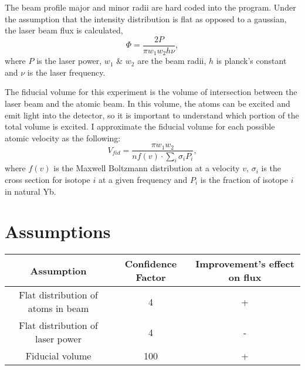 \documentclass[12pt, a4paper]{article}
\begin{document}
The beam profile major and minor radii are hard coded into the program. Under the assumption that the intensity distribution is flat as opposed to a gaussian, the laser beam flux is calculated,
\begin{equation}
\Phi = \frac{2P}{\pi w_1 w_2 h \nu},
\end{equation}
where $P$ is the laser power, $w_1$ \& $w_2$ are the beam radii, $h$ is planck's constant and $\nu$ is the laser frequency.

The fiducial volume for this experiment is the volume of intersection between the laser beam and the atomic beam. In this volume, the atoms can be excited and emit light into the detector, so it is important to understand which portion of the total volume is excited. I approximate the fiducial volume for each possible atomic velocity as the following:
\begin{equation}
V_{fid} = \frac{\pi w_1 w_2}{n f(v) \cdot \sum\limits_{i} \sigma_i P_i},
\end{equation}
where $f(v)$ is the Maxwell Boltzmann distribution at a velocity $v$, $\sigma_i$ is the cross section for isotope $i$ at a given frequency and $P_i$ is the fraction of isotope $i$ in natural Yb.
\section{Assumptions}
\begin{center}
\begin{tabular}{||c|c|c||}
\hline
Assumption & Confidence Factor & Improvement's effect on flux\\
\hline\hline
Flat distribution of atoms in beam & 4 & +\\
\hline
Flat distribution of laser power & 4 & -\\
\hline
Fiducial volume & 100 & + \\
\hline 
\end{tabular}
\end{center}
\nocite{*}
{}

\end{document}
